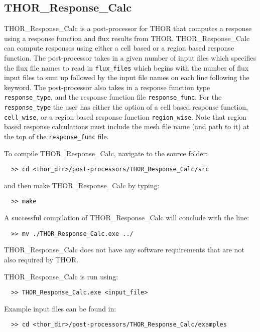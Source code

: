 \subsection{THOR\_Response\_Calc}\label{ch:getstart:sec:preproc:subsec:respcalc}

THOR\_Response\_Calc is a post-processor for THOR that computes a response using a response function and flux results from THOR.
THOR\_Response\_Calc can compute responses using either a cell based or a region based response function.
The post-processor takes in a given number of input files which specifies the flux file names to read in \verb"flux_files" which begins with the number of flux input files to sum up followed by the input file names on each line following the keyword.
The post-processor also takes in a response function type \verb"response_type", and the response function file \verb"response_func".
For the \verb"response_type" the user has either the option of a cell based response function, \verb"cell_wise", or a region based response function \verb"region_wise".
Note that region based response calculations must include the mesh file name (and path to it) at the top of the \verb"response_func" file.

To compile THOR\_Response\_Calc, navigate to the source folder:
\begin{verbatim}
  >> cd <thor_dir>/post-processors/THOR_Response_Calc/src
\end{verbatim}
and then make THOR\_Response\_Calc by typing:
\begin{verbatim}
  >> make
\end{verbatim}
A successful compilation of THOR\_Response\_Calc will conclude with the line:
\begin{verbatim}
  >> mv ./THOR_Response_Calc.exe ../
\end{verbatim}
THOR\_Response\_Calc does not have any software requirements that are not also required by \ac{THOR}.

THOR\_Response\_Calc is run using:
\begin{verbatim}
  >> THOR_Response_Calc.exe <input_file>
\end{verbatim}

Example input files can be found in:
\begin{verbatim}
  >> cd <thor_dir>/post-processors/THOR_Response_Calc/examples
\end{verbatim}

